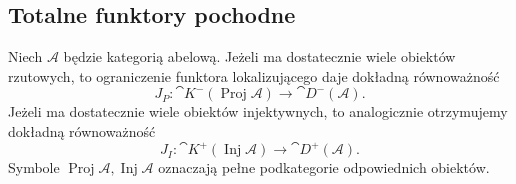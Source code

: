 \subsection{Totalne funktory pochodne}
\begin{twierdzenie}\label{cat:thm:derived-resolution-models}
Niech $\mathcal A$ będzie kategorią abelową. Jeżeli ma dostatecznie wiele obiektów rzutowych, to ograniczenie funktora lokalizującego daje dokładną równoważność
\[
 J_P:\cat K^-(\operatorname{Proj}\mathcal A)
 \longrightarrow\cat D^-(\mathcal A).
\]
Jeżeli ma dostatecznie wiele obiektów injektywnych, to analogicznie otrzymujemy dokładną równoważność
\[
 J_I:\cat K^+(\operatorname{Inj}\mathcal A)
 \longrightarrow\cat D^+(\mathcal A).
\]
Symbole $\operatorname{Proj}\mathcal A,\operatorname{Inj}\mathcal A$ oznaczają pełne podkategorie odpowiednich obiektów.
\end{twierdzenie}
